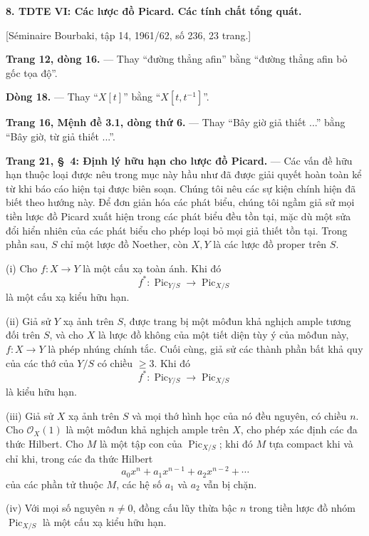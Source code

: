 \documentclass[11pt,twoside,openany]{book}
\numberwithin{equation}{section}
\newcommand{\src}[1]{%
  \phantomsection\hypertarget{src:\fgasourceid:#1}{}%
  \marginpar{\raggedleft\footnotesize\sffamily #1}%
}
\newcommand{\fgasourceid}{unset}
\begin{document}
\noindent\textbf{8. TDTE VI: Các lược đồ Picard. Các tính chất tổng quát.}

\begin{center}
[Séminaire Bourbaki, tập 14, 1961/62, số 236, 23 trang.]
\end{center}

\noindent\textbf{Trang 12, dòng 16.} --- Thay ``đường thẳng afin'' bằng
``đường thẳng afin bỏ gốc tọa độ''.

\noindent\textbf{Dòng 18.} --- Thay ``$X[t]$'' bằng
``$X[t,t^{-1}]$''.

\noindent\textbf{Trang 16, Mệnh đề 3.1, dòng thứ 6.} --- Thay ``Bây giờ giả
thiết ...'' bằng ``Bây giờ, từ giả thiết ...''.

\noindent\textbf{Trang 21, §~4: Định lý hữu hạn cho lược đồ Picard.} --- Các
vấn đề hữu hạn thuộc loại được nêu trong mục này hầu như đã được giải quyết
hoàn toàn kể từ khi báo cáo hiện tại được biên soạn. Chúng tôi nêu các sự kiện
chính hiện đã biết theo hướng này. Để đơn giản hóa các phát biểu, chúng tôi
ngầm giả sử mọi tiền lược đồ Picard xuất hiện trong các phát biểu đều tồn tại,
mặc dù một sửa đổi hiển nhiên của các phát biểu cho phép loại bỏ mọi giả
thiết tồn tại. Trong phần sau, $S$ chỉ một lược đồ Noether, còn $X,Y$ là các
lược đồ proper trên $S$.

\medskip
\noindent(i) Cho $f:X\longrightarrow Y$ là một cấu xạ toàn ánh. Khi đó
\[
f^*: \operatorname{Pic}_{Y/S}\longrightarrow\operatorname{Pic}_{X/S}
\]
là một cấu xạ kiểu hữu hạn.

\src{304}
\noindent(ii) Giả sử $Y$ xạ ảnh trên $S$, được trang bị một môđun khả nghịch
ample tương đối trên $S$, và cho $X$ là lược đồ không của một tiết diện tùy ý
của môđun này, $f:X\longrightarrow Y$ là phép nhúng chính tắc. Cuối cùng, giả
sử các thành phần bất khả quy của các thớ của $Y/S$ có chiều $\geq3$. Khi đó
\[
f^*: \operatorname{Pic}_{Y/S}\longrightarrow\operatorname{Pic}_{X/S}
\]
là kiểu hữu hạn.

\noindent(iii) Giả sử $X$ xạ ảnh trên $S$ và mọi thớ hình học của nó đều
nguyên, có chiều $n$. Cho $\mathcal O_X(1)$ là một môđun khả nghịch ample trên
$X$, cho phép xác định các đa thức Hilbert. Cho $M$ là một tập con của
$\operatorname{Pic}_{X/S}$; khi đó $M$ tựa compact khi và chỉ khi, trong các
đa thức Hilbert
\[
a_0x^n+a_1x^{n-1}+a_2x^{n-2}+\cdots
\]
của các phần tử thuộc $M$, các hệ số $a_1$ và $a_2$ vẫn bị chặn.

\noindent(iv) Với mọi số nguyên $n\neq0$, đồng cấu lũy thừa bậc $n$ trong
tiền lược đồ nhóm $\operatorname{Pic}_{X/S}$ là một cấu xạ kiểu hữu hạn.
\end{document}

